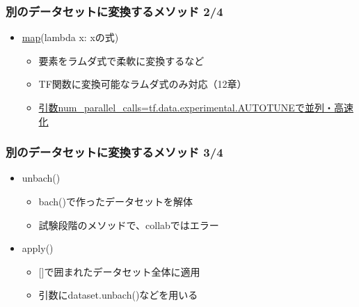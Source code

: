 \hypertarget{ux5225ux306eux30c7ux30fcux30bfux30bbux30c3ux30c8ux306bux5909ux63dbux3059ux308bux30e1ux30bdux30c3ux30c9-24}{%
\subsubsection{別のデータセットに変換するメソッド
2/4}\label{ux5225ux306eux30c7ux30fcux30bfux30bbux30c3ux30c8ux306bux5909ux63dbux3059ux308bux30e1ux30bdux30c3ux30c9-24}}

\begin{itemize}
\tightlist
\item
  \href{https://qiita.com/conf8o/items/0cb02bc504b51af09099}{map}(lambda
  x: xの式)

  \begin{itemize}
  \tightlist
  \item
    要素をラムダ式で柔軟に変換するなど
  \item
    TF関数に変換可能なラムダ式のみ対応（12章）
  \item
    \href{https://tensorflow.classcat.com/2019/03/23/tf20-alpha-guide-data-performance/}{引数num\_parallel\_calls=tf.data.experimental.AUTOTUNEで並列・高速化}
  \end{itemize}
\end{itemize}

\hypertarget{ux5225ux306eux30c7ux30fcux30bfux30bbux30c3ux30c8ux306bux5909ux63dbux3059ux308bux30e1ux30bdux30c3ux30c9-34}{%
\subsubsection{別のデータセットに変換するメソッド
3/4}\label{ux5225ux306eux30c7ux30fcux30bfux30bbux30c3ux30c8ux306bux5909ux63dbux3059ux308bux30e1ux30bdux30c3ux30c9-34}}

\begin{itemize}
\tightlist
\item
  unbach()

  \begin{itemize}
  \tightlist
  \item
    bach()で作ったデータセットを解体
  \item
    試験段階のメソッドで、collabではエラー
  \end{itemize}
\item
  apply()

  \begin{itemize}
  \tightlist
  \item
    {[}{]}で囲まれたデータセット全体に適用
  \item
    引数にdataset.unbach()などを用いる
  \end{itemize}
\end{itemize}

